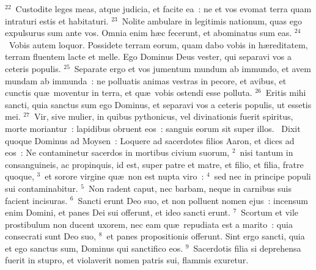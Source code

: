 ${}^{22}$~Custodite leges meas, atque judicia, et facite ea~: ne et vos evomat terra quam intraturi estis et habitaturi.
${}^{23}$~Nolite ambulare in legitimis nationum, quas ego expulsurus sum ante vos. Omnia enim h\ae c fecerunt, et abominatus sum eas.
${}^{24}$~Vobis autem loquor. Possidete terram eorum, quam dabo vobis in h\ae reditatem, terram fluentem lacte et melle. Ego Dominus Deus vester, qui separavi vos a ceteris populis.
${}^{25}$~Separate ergo et vos jumentum mundum ab immundo, et avem mundam ab immunda~: ne polluatis animas vestras in pecore, et avibus, et cunctis qu\ae\ moventur in terra, et qu\ae\ vobis ostendi esse polluta.
${}^{26}$~Eritis mihi sancti, quia sanctus sum ego Dominus, et separavi vos a ceteris populis, ut essetis mei.
${}^{27}$~Vir, sive mulier, in quibus pythonicus, vel divinationis fuerit spiritus, morte moriantur~: lapidibus obruent eos~: sanguis eorum sit super illos.
~\lettrine[lines=10,image=true,loversize=0.05,lraise=-0.03]{D}{}ixit quoque Dominus ad Moysen~: Loquere ad sacerdotes filios Aaron, et dices ad eos~: Ne contaminetur sacerdos in mortibus civium suorum,
${}^{2}$~nisi tantum in consanguineis, ac propinquis, id est, super patre et matre, et filio, et filia, fratre quoque,
${}^{3}$~et sorore virgine qu\ae\ non est nupta viro~:
${}^{4}$~sed nec in principe populi sui contaminabitur.
${}^{5}$~Non radent caput, nec barbam, neque in carnibus suis facient incisuras.
${}^{6}$~Sancti erunt Deo suo, et non polluent nomen ejus~: incensum enim Domini, et panes Dei sui offerunt, et ideo sancti erunt.
${}^{7}$~Scortum et vile prostibulum non ducent uxorem, nec eam qu\ae\ repudiata est a marito~: quia consecrati sunt Deo suo,
${}^{8}$~et panes propositionis offerunt. Sint ergo sancti, quia et ego sanctus sum, Dominus qui sanctifico eos.
${}^{9}$~Sacerdotis filia si deprehensa fuerit in stupro, et violaverit nomen patris sui, flammis exuretur.


